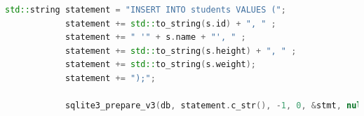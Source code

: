 \documentclass [11pt,a4paper,dvipdfmx] {jarticle}
\begin{document}
\begin{lstlisting}[language=C++]
            std::string statement = "INSERT INTO students VALUES (";                                                                                                                                                                                                                    
            statement += std::to_string(s.id) + ", " ;                                                                                                                                                                                                                                  
            statement += " '" + s.name + "', " ;                                                                                                                                                                                                                                        
            statement += std::to_string(s.height) + ", " ;                                                                                                                                                                                                                              
            statement += std::to_string(s.weight);                                                                                                                                                                                                                                      
            statement += ");";                                                                                                                                                                                                                                                          
                                                                                                                                                                                                                                                                                      
            sqlite3_prepare_v3(db, statement.c_str(), -1, 0, &stmt, nullptr);                                                                                                                                                                                                           
                                                                                                                                                                                                                                                                                      

\end{lstlisting}
\end{document}
